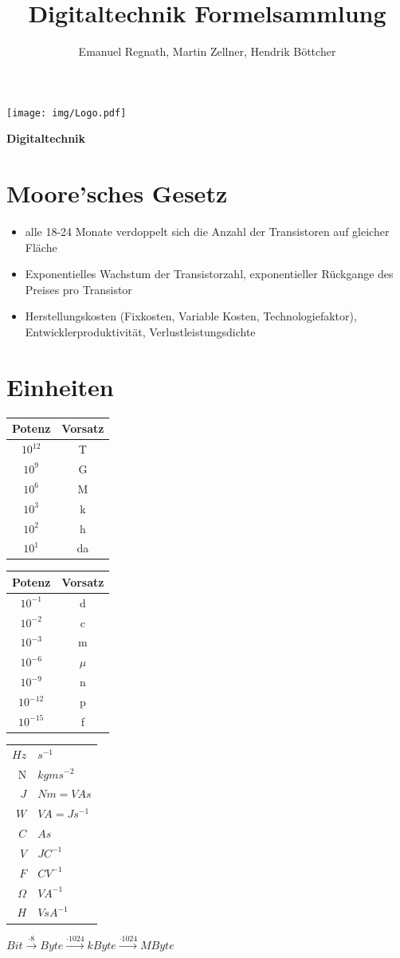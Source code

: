 \documentclass[6pt,a4paper]{scrartcl}
\title{Digitaltechnik Formelsammlung}
\author{Emanuel Regnath, Martin Zellner, Hendrik Böttcher}
\renewcommand{\emph}[1]{\textsf{\textbf{#1}}}
\begin{document}
\begin{multicols*}{3}

\parbox{2.3cm}{
	\texttt{[image: img/Logo.pdf]}
}
\parbox{4cm}{
	\emph{\huge{Digitaltechnik}}
}

\section{Moore'sches Gesetz}
\begin{itemize} \itemsep0pt
	\item alle 18-24 Monate verdoppelt sich die Anzahl der Transistoren auf gleicher Fläche
	\item Exponentielles Wachstum der Transistorzahl, exponentieller Rückgange des Preises pro Transistor
	\item Herstellungskosten (Fixkosten, Variable Kosten, Technologiefaktor), Entwicklerproduktivität, Verlustleistungsdichte
\end{itemize}
\section{Einheiten}
\begin{multicols}{3}
\begin{tabular}{c | c}
	Potenz & Vorsatz \\ \midrule
	$10^{12}$ & T \\
	$10^{9}$ & G \\
	$10^{6}$ & M \\
	$10^{3}$ & k \\
	$10^{2}$ & h \\
	$10^{1}$ & da 
\end{tabular}
\begin{tabular}{c | c}
	Potenz & Vorsatz \\ \midrule
	$10^{-1}$ & d \\
	$10^{-2}$ & c \\
	$10^{-3}$ & m \\
	$10^{-6}$ & $\mu$	\\
	$10^{-9}$ & n \\
	$10^{-12}$ & p \\
	$10^{-15}$ & f
\end{tabular}
\begin{tabular}{ r | l }
$Hz$ & $s^{-1}$ \\
N & $kg m s^{-2} $ \\
$J $ & $ N m = V A s$\\
$W $ & $ V A  = J s^{-1} $ \\
$ C $ & $ A s $ \\
$V $ & $ J C^{-1} $\\
$F $ & $ C V^{-1} $ \\
$\Omega $ & $ V A^{-1} $\\
$ H $ & $ V s  A^{-1}$
\end{tabular}
\end{multicols}
$Bit \xrightarrow{\cdot 8} Byte \xrightarrow{\cdot 1024} kByte \xrightarrow{\cdot 1024} MByte$	

\end{multicols*}
\end{document}
